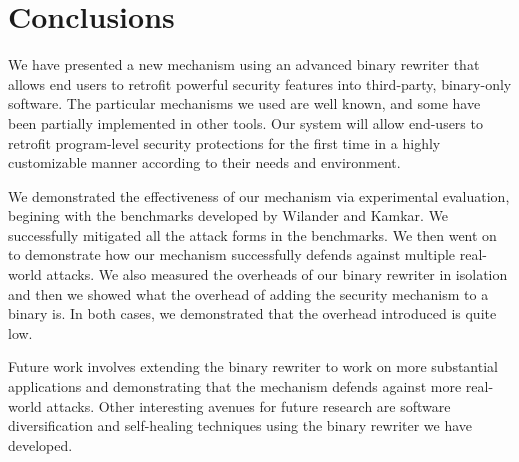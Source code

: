 \section{Conclusions}
\label{sec:conclusions}

We have presented a new mechanism using an advanced binary rewriter
that allows end users to retrofit powerful security features into
third-party, binary-only software. The particular mechanisms we used
are well known, and some have been partially implemented in other
tools.  Our system will allow end-users to retrofit program-level
security protections for the first time in a highly customizable
manner according to their needs and environment.

We demonstrated the effectiveness of our mechanism via experimental
evaluation, begining with the benchmarks developed by Wilander and
Kamkar. We successfully mitigated all the attack forms in the
benchmarks. We then went on to demonstrate how our mechanism
successfully defends against multiple real-world attacks. We also
measured the overheads of our binary rewriter in isolation and then we
showed what the overhead of adding the security mechanism to a binary
is. In both cases, we demonstrated that the overhead introduced is
quite low.

Future work involves extending the binary rewriter to work on more
substantial applications and demonstrating that the mechanism defends
against more real-world attacks. Other interesting avenues for future
research are software diversification and self-healing techniques
using the binary rewriter we have developed.
